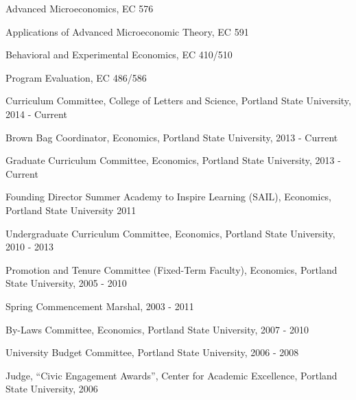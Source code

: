 \documentclass[Computer Science]{vita}
\begin{document}
\begin{vita}
\begin{Instructional Activities}
\begin{Courses}
    \item Advanced Microeconomics, EC 576
    \item Applications of Advanced Microeconomic Theory, EC 591

    \item Behavioral and Experimental Economics, EC 410/510
    \item Program Evaluation, EC 486/586
    \end{Courses}

      
  \end{Instructional Activities}
  \begin{Professional and Service Activities}

    \begin{University}
    
    \item Curriculum Committee, College of Letters and Science, Portland State University, 2014 - Current
    
    \item Brown Bag Coordinator, Economics, Portland State University, 2013 - Current
    
    \item Graduate Curriculum Committee, Economics, Portland State University, 2013 - Current

\item Founding Director Summer Academy to Inspire Learning (SAIL), Economics, Portland State University 2011

    \item Undergraduate Curriculum Committee, Economics, Portland
      State University, 2010 - 2013

    \item Promotion and Tenure Committee (Fixed-Term Faculty),
      Economics, Portland State University, 2005 - 2010

    \item Spring Commencement Marshal, 2003 - 2011
  
    \item By-Laws Committee, Economics, Portland State University,
      2007 - 2010

    \item University Budget Committee, Portland State University, 2006
      - 2008

    \item Judge, ``Civic Engagement Awards'', Center for Academic
      Excellence, Portland State University, 2006

    \end{University}


\end{Professional and Service Activities}
\end{vita}
\end{document}
